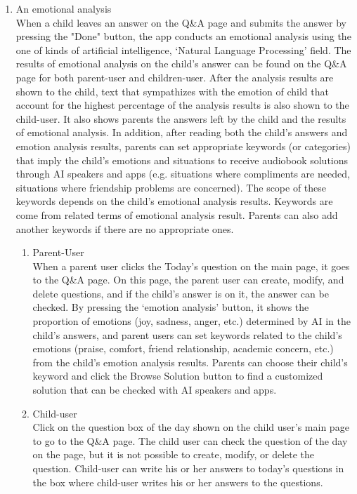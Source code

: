 \documentclass[conference]{IEEEtran}
\begin{document}
\begin{enumerate}
  \item An emotional analysis
  \\
  When a child leaves an answer on the Q\&A page and submits the answer by pressing the "Done" button, the app conducts an emotional analysis using the one of kinds of artificial intelligence, ‘Natural Language Processing’ field. The results of emotional analysis on the child's answer can be found on the Q\&A page for both parent-user and children-user. After the analysis results are shown to the child, text that sympathizes with the emotion of child that account for the highest percentage of the analysis results is also shown to the child-user. It also shows parents the answers left by the child and the results of emotional analysis. In addition, after reading both the child's answers and emotion analysis results, parents can set appropriate keywords (or categories) that imply the child's emotions and situations to receive audiobook solutions through AI speakers and apps (e.g. situations where compliments are needed, situations where friendship problems are concerned). The scope of these keywords depends on the child's emotional analysis results. Keywords are come from related terms of emotional analysis result. Parents can also add another keywords if there are no appropriate ones.
  
  \begin{enumerate}
    \item Parent-User
    \\When a parent user clicks the Today's question on the main page, it goes to the Q\&A page. On this page, the parent user can create, modify, and delete questions, and if the child's answer is on it, the answer can be checked. By pressing the ‘emotion analysis’ button, it shows the proportion of emotions (joy, sadness, anger, etc.) determined by AI in the child's answers, and parent users can set keywords related to the child's emotions (praise, comfort, friend relationship, academic concern, etc.) from the child’s emotion analysis results. Parents can choose their child's keyword and click the Browse Solution button to find a customized solution that can be checked with AI speakers and apps.\\
    \item Child-user
    \\Click on the question box of the day shown on the child user's main page to go to the Q\&A page. The child user can check the question of the day on the page, but it is not possible to create, modify, or delete the question. Child-user can write his or her answers to today's questions in the box where child-user writes his or her answers to the questions.
  \end{enumerate}
\end{enumerate}
\vspace{0.5cm}
\end{document}
